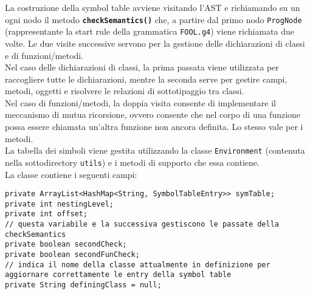 \documentclass[a4paper]{article}   %
\begin{document}
La costruzione della symbol table avviene visitando l'AST e richiamando su un ogni nodo il metodo \textbf{\lstinline|checkSemantics()|} che, a partire dal primo nodo \lstinline|ProgNode| (rappresentante la start rule della grammatica \lstinline|FOOL.g4|) viene richiamata due volte. Le due visite successive servono per la gestione delle dichiarazioni di classi e di funzioni/metodi.\\
Nel caso delle dichiarazioni di classi, la prima passata viene utilizzata per raccogliere tutte le dichiarazioni, mentre la seconda serve per gestire campi, metodi, oggetti e risolvere le relazioni di sottotipaggio tra classi.\\
Nel caso di funzioni/metodi, la doppia visita consente di implementare il meccanismo di mutua ricorsione, ovvero consente che nel corpo di una funzione possa essere chiamata un'altra funzione non ancora definita. Lo stesso vale per i metodi.\\

La tabella dei simboli viene gestita utilizzando la classe \lstinline|Environment| (contenuta nella sottodirectory \lstinline|utils|) e i metodi di supporto che essa contiene.\\
La classe contiene i seguenti campi:\\

\begin{lstlisting}[basicstyle=\footnotesize\ttfamily]
private ArrayList<HashMap<String, SymbolTableEntry>> symTable;
private int nestingLevel;
private int offset;
// questa variabile e la successiva gestiscono le passate della checkSemantics
private boolean secondCheck;
private boolean secondFunCheck;
// indica il nome della classe attualmente in definizione per aggiornare correttamente le entry della symbol table
private String definingClass = null;
\end{lstlisting}
\end{document}
